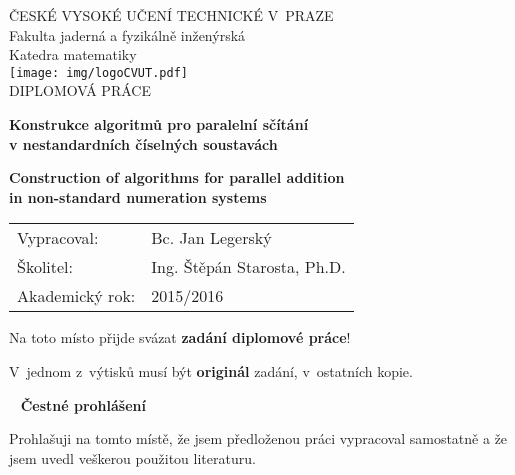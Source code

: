 \documentclass[a4paper, 11pt, twoside, openright]{report}
\theoremstyle{definition}
\newcommand{\cvut}{ČESKÉ VYSOKÉ UČENÍ TECHNICKÉ V~PRAZE}
\newcommand{\fjfi}{Fakulta jaderná a fyzikálně inženýrská}
\newcommand{\km}{Katedra matematiky}
\newcommand{\nazevczBreaked}{Konstrukce algoritm\r u pro paraleln\'i s\v c\'it\'an\'i \\[8pt] v nestandardn\'ich \v c\'iseln\'ych soustav\'ach}
\newcommand{\nazevenBreaked}{Construction of algorithms for parallel addition  \\[8pt] in non-standard numeration systems}
\newcommand{\autor}{Jan Legersk\'y}
\newcommand{\autorBc}{Bc. Jan Legersk\'y}
\newcommand{\vedouci}{Ing. \v St\v ep\'an Starosta, Ph.D.}
\begin{document}
\begin{titlepage}
%


\thispagestyle{empty}
\begin{center}
	{\Large \cvut \\[10pt] \fjfi \\[10pt] \km\\}
	\vspace{45pt} %
	\texttt{[image: img/logoCVUT.pdf]}\\
	\vspace{90pt}
	{\Large DIPLOMOV\'A PR\'ACE}
	\vspace{90pt}
	
	{\Large\bf \nazevczBreaked}
	\vspace{30pt}
	
	{\Large\bf \nazevenBreaked}
\end{center}
\vfill
{
	\Large
	\begin{tabular}{ll}
	Vypracoval: & \autorBc\\[3pt]
	\v Skolitel: & \vedouci\\[3pt]
	Akademick\'y rok: & 2015/2016
	\end{tabular}
}
\cleardoublepage
\thispagestyle{empty}

 \thispagestyle{empty}
 \Large
 Na toto místo přijde svázat \textbf{zadání diplomové práce}!
 
 \vspace{4mm}
 V~jednom z~výtisků musí být \textbf{originál} zadání, v~ostatních kopie.
 \normalsize
\cleardoublepage

\thispagestyle{empty}
~
\vfill
\noindent\textbf{Čestné prohlášení}
\vspace{0.5cm}

Prohla\v suji na tomto m\'ist\v e, \v ze jsem p\v redlo\v zenou pr\'aci vypracoval samostatn\v e a \v ze jsem uvedl ve\v skerou pou\v zitou literaturu.
\vspace{1.5cm}


\end{titlepage}
\end{document}
